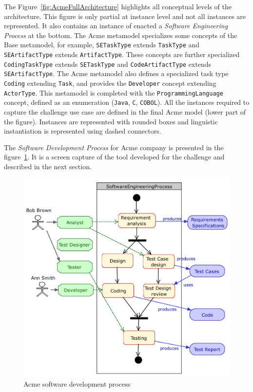 The Figure~\ref{fig:AcmeFullArchitecture} highlights all conceptual levels of the architecture. This figure is only partial at instance level and not all instances are represented. It also contains an instance of enacted a \textit{Software Engineering Process} at the bottom. The Acme metamodel specializes some concepts of the Base metamodel, for example, \texttt{SETaskType} extends \texttt{TaskType} and \texttt{SEArtifactType} extends \texttt{ArtifactType}. These concepts are further specialized  \texttt{CodingTaskType} extends \texttt{SETaskType} and \texttt{CodeArtifactType} extends \texttt{SEArtifactType}.
The Acme metamodel also defines a specialized task type \texttt{Coding} extending \texttt{Task}, and provides the \texttt{Developer} concept extending \texttt{ActorType}. This metamodel is completed with the \texttt{ProgrammingLanguage} concept, defined as an enumeration (\texttt{Java}, \texttt{C}, \texttt{COBOL}). All the instances required to capture the challenge use case are defined in the final Acme model (lower part of the figure). Instances are represented with rounded boxes and linguistic instantiation is represented using dashed connectors.

The \textit{Software Development Process} for Acme company is presented in the figure~\ref{fig:AcmeSoftwareDevelopmentProcess}. It is a screen capture of the tool developed for the challenge and described in the next section.

\begin{figure}[t]
 \centering
    \includegraphics[width=1.0 \columnwidth]{Figures/SoftwareEngineeringProcessCroped.pdf}
     \caption{Acme software development process}
    \label{fig:AcmeSoftwareDevelopmentProcess}
\end{figure}

